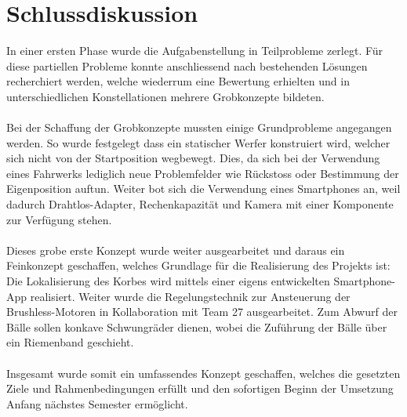 \section{Schlussdiskussion}
In einer ersten Phase wurde die Aufgabenstellung in Teilprobleme zerlegt. Für diese partiellen Probleme konnte anschliessend nach bestehenden Lösungen recherchiert werden, welche wiederrum eine Bewertung erhielten und in unterschiedlichen Konstellationen mehrere Grobkonzepte bildeten. \\
\\
Bei der Schaffung der Grobkonzepte mussten einige Grundprobleme angegangen werden. So wurde festgelegt dass ein statischer Werfer konstruiert wird, welcher sich nicht von der Startposition wegbewegt. Dies, da sich bei der Verwendung eines Fahrwerks lediglich neue Problemfelder wie Rückstoss oder Bestimmung der Eigenposition auftun. Weiter bot sich die Verwendung eines Smartphones an, weil dadurch Drahtlos-Adapter, Rechenkapazität und Kamera mit einer Komponente zur Verfügung stehen. \\
\\
Dieses grobe erste Konzept wurde weiter ausgearbeitet und daraus ein Feinkonzept geschaffen, welches Grundlage für die Realisierung des Projekts ist: Die Lokalisierung des Korbes wird mittels einer eigens entwickelten Smartphone-App realisiert. Weiter wurde die Regelungstechnik zur Ansteuerung der Brushless-Motoren in Kollaboration mit Team 27 ausgearbeitet. Zum Abwurf der Bälle sollen konkave Schwungräder dienen, wobei die Zuführung der Bälle über ein Riemenband geschieht. \\
\\
Insgesamt wurde somit ein umfassendes Konzept geschaffen, welches die gesetzten Ziele und Rahmenbedingungen erfüllt und den sofortigen Beginn der Umsetzung Anfang nächstes Semester ermöglicht.